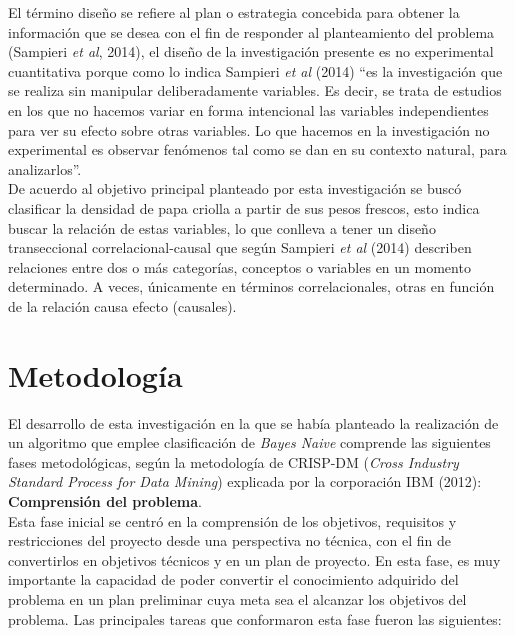 El término diseño se refiere al plan o estrategia concebida para obtener la información que se desea con el fin de responder al
planteamiento del problema (Sampieri \textit{et al}, 2014), el diseño de la investigación presente es no experimental cuantitativa porque como lo indica Sampieri \textit{et al} (2014) “es la investigación que se realiza sin manipular deliberadamente variables. Es decir, se trata de estudios en los que no hacemos variar en forma intencional las variables independientes para ver su efecto sobre otras variables. Lo que hacemos en la investigación no experimental es observar fenómenos tal como se dan en su contexto natural, para analizarlos”.\\

De acuerdo al objetivo principal planteado por esta investigación se buscó clasificar la densidad de papa criolla a partir de sus pesos frescos, esto indica buscar la relación de estas variables, lo que conlleva a tener un diseño transeccional correlacional-causal que según Sampieri \textit{et al} (2014) describen relaciones entre dos o más categorías, conceptos o variables en un momento determinado. A veces, únicamente en términos correlacionales, otras en función de la relación causa efecto (causales).


\section{Metodolog\'ia}

El desarrollo de esta investigación en la que se había planteado la realización de un algoritmo que emplee clasificación de \textit{Bayes Naive} comprende las siguientes fases metodológicas, según la metodología de CRISP-DM (\emph{Cross Industry Standard Process for Data Mining}) explicada por la corporación IBM (2012):\\

\noindent
\textbf{Comprensión del problema}.\\

	Esta fase inicial se centró en la comprensión de los objetivos, requisitos y restricciones del proyecto desde una perspectiva no técnica, con el fin de convertirlos en objetivos técnicos y en un plan de proyecto. En esta fase, es muy importante la capacidad de poder convertir el conocimiento adquirido del problema en un plan preliminar cuya meta sea el alcanzar los objetivos del problema. Las principales tareas que conformaron esta fase fueron las siguientes:\\

